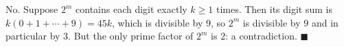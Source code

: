No. Suppose $2^m$ contains each digit exactly $k\ge1$ times. Then its digit sum is $k(0+1+\cdots+9)=45k$, which is divisible by $9$, so $2^m$ is divisible by $9$ and in particular by $3$. But the only prime factor of $2^m$ is $2$: a contradiction. $\blacksquare$
